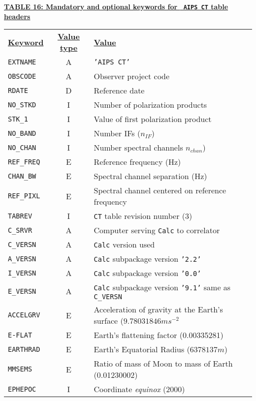 \documentclass[twoside]{article}
\newcommand{\nif}{$n_{IF}$}
\newcommand{\nchan}{$n_{chan}$}
\begin{document}
\begin{center}
\underline{\bf{TABLE 16: Mandatory and optional keywords for {\tt
   AIPS CT} table headers}}\\
\begin{tabular}{lcl}
\noalign{\vspace{2pt}} \label{ta:CTkeys}
\underline{{\bf Keyword}} & \underline{\bf{Value type}} &
    \underline{\bf{Value\vphantom{y}}} \\
\noalign{\vspace{2pt}}
{\tt EXTNAME}   & A & {\tt 'AIPS CT'}  \\
{\tt OBSCODE}   & A & Observer project code \\
{\tt RDATE}     & D & Reference date \\
{\tt NO\_STKD}  & I & Number of polarization products \\
{\tt STK\_1}    & I & Value of first polarization product \\
{\tt NO\_BAND}  & I & Number IFs (\nif) \\
{\tt NO\_CHAN}  & I & Number spectral channels \nchan) \\
{\tt REF\_FREQ} & E & Reference frequency (Hz) \\
{\tt CHAN\_BW}  & E & Spectral channel separation (Hz) \\
{\tt REF\_PIXL} & E & Spectral channel centered on reference frequency \\
{\tt TABREV}    & I & {\tt CT} table revision number (3) \\
{\tt C\_SRVR}   & A & Computer serving {\tt Calc} to correlator \\
{\tt C\_VERSN}  & A & {\tt Calc} version used \\
\hline
{\tt A\_VERSN}  & A & {\tt Calc} subpackage version {\tt '2.2'} \\
{\tt I\_VERSN}  & A & {\tt Calc} subpackage version {\tt '0.0'} \\
{\tt E\_VERSN}  & A & {\tt Calc} subpackage version {\tt '9.1'} same as {\tt C\_VERSN} \\
{\tt ACCELGRV}  & E & Acceleration of gravity at the Earth's surface ($9.78031846 m s^{-2}$\\
{\tt E-FLAT}    & E & Earth's flattening factor (0.00335281) \\
{\tt EARTHRAD}  & E & Earth's Equatorial Radius ($6378137 m$) \\
{\tt MMSEMS}    & E & Ratio of mass of Moon to mass of Earth (0.01230002)\\
{\tt EPHEPOC}   & I & Coordinate {\it equinox} (2000)\\

\end{tabular}
\end{center}
\end{document}
